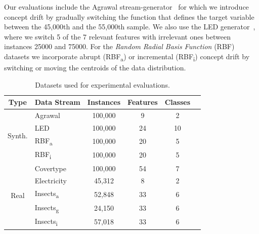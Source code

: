 \documentclass{article} %
\begin{document}
Our evaluations include the Agrawal stream-generator~\citep{agrawalDatabaseMiningPerformance1993} for which we introduce concept drift by gradually switching the function that defines the target variable between the 45,000th and the 55,000th sample.
We also use the LED generator~\citep{gordonClassificationRegressionTrees1984}, where we switch 5 of the 7 relevant features with irrelevant ones between instances 25000 and 75000.
For the \textit{Random Radial Basis Function} (RBF) datasets we incorporate abrupt (RBF\textsubscript{a}) or incremental (RBF\textsubscript{i}) concept drift by switching or moving the centroids of the data distribution.

\begin{table}[ht]
   \centering
   \small
   \caption{Datasets used for experimental evaluations.}
   \begin{tabular}{@{}clcccc@{}}
      \toprule
      Type                    & Data Stream              & Instances               & Features & Classes \\
      \midrule
      \multirow{4}{*}{Synth.} & Agrawal                  & 100,000                 & 9        & 2       \\
                              & LED                      & 100,000                 & 24       & 10      \\
                              & RBF\textsubscript{a}     & 100,000                 & 20       & 5       \\
                              & RBF\textsubscript{i}     & 100,000                 & 20       & 5       \\
      \midrule
      \multirow{5}{*}{Real}   & Covertype                & 100,000\footnotemark[4] & 54       & 7       \\
                              & Electricity              & 45,312                  & 8        & 2       \\
                              & Insects\textsubscript{a} & 52,848                  & 33       & 6       \\
                              & Insects\textsubscript{g} & 24,150                  & 33       & 6       \\
                              & Insects\textsubscript{i} & 57,018                  & 33       & 6       \\
      \bottomrule
   \end{tabular}
   \label{tab:datasets}
\end{table}
\end{document}
